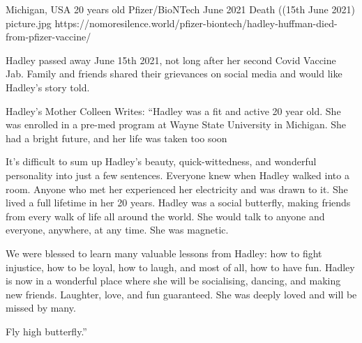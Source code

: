{Michigan, USA}
{20 years old}
{Pfizer/BioNTech}
{June 2021}
{Death ((15th June 2021)}
{picture.jpg}
{https://nomoresilence.world/pfizer-biontech/hadley-huffman-died-from-pfizer-vaccine/}
{

Hadley passed away June 15th 2021, not long after her second Covid Vaccine
Jab. Family and friends shared their grievances on social media and would like
Hadley’s story told.

Hadley’s Mother Colleen Writes: “Hadley was a fit and active 20 year old. She
was enrolled in a pre-med program at Wayne State University in Michigan. She had
a bright future, and her life was taken too soon

It’s difficult to sum up Hadley’s beauty, quick-wittedness, and wonderful
personality into just a few sentences. Everyone knew when Hadley walked into a
room. Anyone who met her experienced her electricity and was drawn to it. She
lived a full lifetime in her 20 years. Hadley was a social butterfly, making
friends from every walk of life all around the world. She would talk to anyone
and everyone, anywhere, at any time. She was magnetic.

We were blessed to learn many valuable lessons from Hadley: how to fight
injustice, how to be loyal, how to laugh, and most of all, how to have
fun. Hadley is now in a wonderful place where she will be socialising, dancing,
and making new friends. Laughter, love, and fun guaranteed. She was deeply loved
and will be missed by many.

Fly high butterfly.”

}
